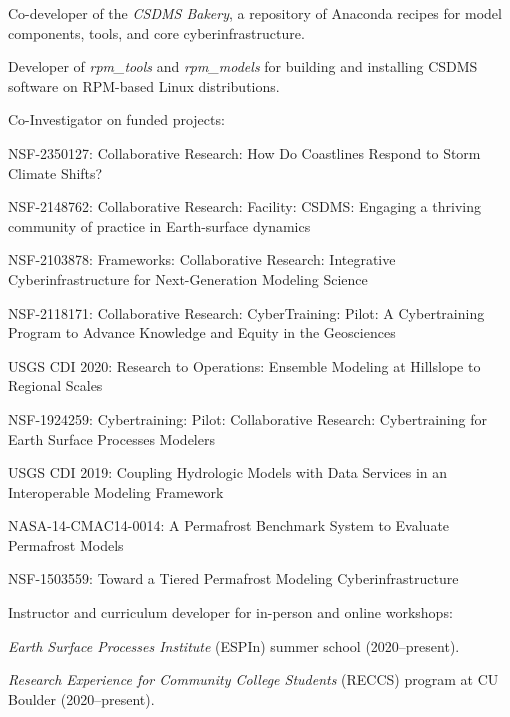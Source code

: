 \begin{compactitem}[\itembullet]
    Co-developer of the \textit{CSDMS Bakery}, a repository of Anaconda recipes
    for model components, tools, and core cyberinfrastructure.
  \item
    Developer of \textit{rpm\_tools} and \textit{rpm\_models} for building and
    installing CSDMS software on RPM-based Linux distributions.
  \item Co-Investigator on funded projects:
    \begin{compactitem}[\itembullet]
      \item
        NSF-2350127: Collaborative Research: How Do Coastlines Respond to Storm
        Climate Shifts?
      \item
        NSF-2148762: Collaborative Research: Facility: CSDMS: Engaging a
        thriving community of practice in Earth-surface dynamics
        \item
        NSF-2103878: Frameworks: Collaborative Research: Integrative
        Cyberinfrastructure for Next-Generation Modeling Science
      \item
        NSF-2118171: Collaborative Research: CyberTraining: Pilot: A
        Cybertraining Program to Advance Knowledge and Equity in the Geosciences
      \item
        USGS CDI 2020: Research to Operations: Ensemble Modeling at
        Hillslope to Regional Scales
      \item
        NSF-1924259: Cybertraining: Pilot: Collaborative Research:
        Cybertraining for Earth Surface Processes Modelers
      \item
        USGS CDI 2019: Coupling Hydrologic Models with Data Services
        in an Interoperable Modeling Framework
      \item
        NASA-14-CMAC14-0014: A Permafrost Benchmark System to Evaluate
        Permafrost Models
      \item
        NSF-1503559: Toward a Tiered Permafrost Modeling Cyberinfrastructure
    \end{compactitem}
  \item Instructor and curriculum developer for in-person and online workshops:
    \begin{compactitem}[\itembullet]
      \item
        \textit{Earth Surface Processes Institute} (ESPIn) summer school
        (2020--present).
      \item
        \textit{Research Experience for Community College Students} (RECCS)
        program at CU Boulder (2020--present).
      \item

\end{compactitem}
\end{compactitem}
